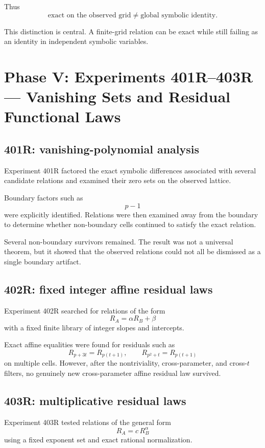 \documentclass[11pt,a4paper]{article}
\begin{document}
Thus
\[
\boxed{
\text{exact on the observed grid}
\neq
\text{global symbolic identity}.
}
\]

This distinction is central. A finite-grid relation can be exact while still failing as an identity in independent symbolic variables.

\section{Phase V: Experiments 401R--403R --- Vanishing Sets and Residual Functional Laws}

\subsection{401R: vanishing-polynomial analysis}

Experiment 401R factored the exact symbolic differences associated with several candidate relations and examined their zero sets on the observed lattice.

Boundary factors such as
\[
p-1
\]
were explicitly identified. Relations were then examined away from the boundary to determine whether non-boundary cells continued to satisfy the exact relation.

Several non-boundary survivors remained. The result was not a universal theorem, but it showed that the observed relations could not all be dismissed as a single boundary artifact.

\subsection{402R: fixed integer affine residual laws}

Experiment 402R searched for relations of the form
\[
R_A=\alpha R_B+\beta
\]
with a fixed finite library of integer slopes and intercepts.

Exact affine equalities were found for residuals such as
\[
R_{p+3t}=R_{p(t+1)},
\qquad
R_{p^2+t}=R_{p(t+1)}
\]
on multiple cells. However, after the nontriviality, cross-parameter, and cross-$t$ filters, no genuinely new cross-parameter affine residual law survived.

\subsection{403R: multiplicative residual laws}

Experiment 403R tested relations of the general form
\[
R_A=c\,R_B^\alpha
\]
using a fixed exponent set and exact rational normalization.
\end{document}
